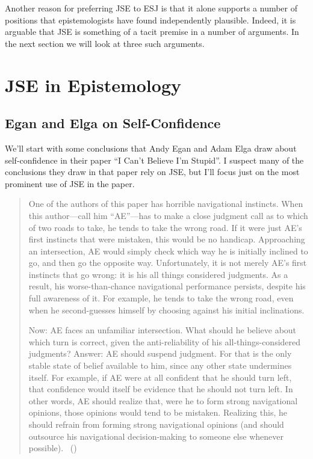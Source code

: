 \documentclass[
  10pt,
  letterpaper,
  twoside]{scrbook}
\begin{document}
Another reason for preferring JSE to ESJ is that it alone supports a
number of positions that epistemologists have found independently
plausible. Indeed, it is arguable that JSE is something of a tacit
premise in a number of arguments. In the next section we will look at
three such arguments.

\section{JSE in Epistemology}\label{jseinepistemology}

\subsection{Egan and Elga on
Self-Confidence}\label{eganandelgaonself-confidence}

We'll start with some conclusions that Andy Egan and Adam Elga draw
about self-confidence in their paper ``I Can't Believe I'm Stupid''. I
suspect many of the conclusions they draw in that paper rely on JSE, but
I'll focus just on the most prominent use of JSE in the paper.

\begin{quote}
One of the authors of this paper has horrible navigational instincts.
When this author---call him ``{AE}''---has to make a close judgment call
as to which of two roads to take, he tends to take the wrong road. If it
were just {AE}'s first instincts that were mistaken, this would be no
handicap. Approaching an intersection, {AE} would simply check which way
he is initially inclined to go, and then go the opposite way.
Unfortunately, it is not merely {AE}'s first instincts that go wrong: it
is his all things considered judgments. As a result, his
worse-than-chance navigational performance persists, despite his full
awareness of it. For example, he tends to take the wrong road, even when
he second-guesses himself by choosing against his initial inclinations.

Now: {AE} faces an unfamiliar intersection. What should he believe about
which turn is correct, given the anti-reliability of his
all-things-considered judgments? Answer: {AE} should suspend judgment.
For that is the only stable state of belief available to him, since any
other state undermines itself. For example, if {AE} were at all
confident that he should turn left, that confidence would itself be
evidence that he should not turn left. In other words, {AE} should
realize that, were he to form strong navigational opinions, those
opinions would tend to be mistaken. Realizing this, he should refrain
from forming strong navigational opinions (and should outsource his
navigational decision-making to someone else whenever possible).
~()
\end{quote}
\end{document}
